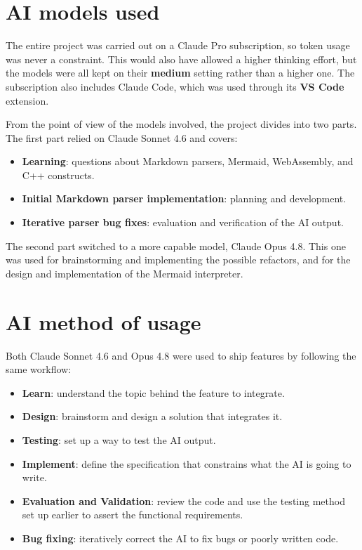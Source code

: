 \documentclass[12pt]{report}
\begin{document}
\section{AI models used}

The entire project was carried out on a Claude Pro subscription, so token usage was never a constraint. This would also have allowed a higher thinking effort, but the models were all kept on their \textbf{medium} setting rather than a higher one. The subscription also includes Claude Code, which was used through its \textbf{VS Code} extension.

From the point of view of the models involved, the project divides into two parts. The first part relied on Claude Sonnet 4.6 and covers:
\begin{itemize}
    \item \textbf{Learning}: questions about Markdown parsers, Mermaid, WebAssembly, and C++ constructs.
    \item \textbf{Initial Markdown parser implementation}: planning and development.
    \item \textbf{Iterative parser bug fixes}: evaluation and verification of the AI output.
\end{itemize}

The second part switched to a more capable model, Claude Opus 4.8. This one was used for brainstorming and implementing the possible refactors, and for the design and implementation of the Mermaid interpreter.

\section{AI method of usage}

Both Claude Sonnet 4.6 and Opus 4.8 were used to ship features by following the same workflow:
\begin{itemize}
    \item \textbf{Learn}: understand the topic behind the feature to integrate.
    \item \textbf{Design}: brainstorm and design a solution that integrates it.
    \item \textbf{Testing}: set up a way to test the AI output.
    \item \textbf{Implement}: define the specification that constrains what the AI is going to write.
    \item \textbf{Evaluation and Validation}: review the code and use the testing method set up earlier to assert the functional requirements.
    \item \textbf{Bug fixing}: iteratively correct the AI to fix bugs or poorly written code.
\end{itemize}
\end{document}
